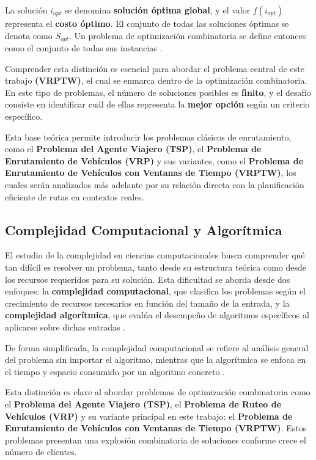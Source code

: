 \documentclass[12pt,titlepage,twoside,openright]{book}
\begin{document}
La solución \(i_{opt}\) se denomina \textbf{solución óptima global}, y el valor \(f(i_{opt})\) representa el \textbf{costo óptimo}. El conjunto de todas las soluciones óptimas se denota como \(S_{opt}\). Un problema de optimización combinatoria se define entonces como el conjunto de todas sus instancias \citep{cobos2010}.

Comprender esta distinción es esencial para abordar el problema central de este trabajo \textbf{(VRPTW)}, el cual se enmarca dentro de la optimización combinatoria. En este tipo de problemas, el número de soluciones posibles es \textbf{finito}, y el desafío consiste en identificar cuál de ellas representa la \textbf{mejor opción} según un criterio específico.

Esta base teórica permite introducir los problemas clásicos de enrutamiento, como el \textbf{Problema del Agente Viajero (TSP)}, el \textbf{Problema de Enrutamiento de Vehículos (VRP)} y sus variantes, como el \textbf{Problema de Enrutamiento de Vehículos con Ventanas de Tiempo (VRPTW)}, los cuales serán analizados más adelante por su relación directa con la planificación eficiente de rutas en contextos reales.

\subsection{Complejidad Computacional y Algorítmica}

El estudio de la complejidad en ciencias computacionales busca comprender qué tan difícil es resolver un problema, tanto desde su estructura teórica como desde los recursos requeridos para su solución. Esta dificultad se aborda desde dos enfoques: la \textbf{complejidad computacional}, que clasifica los problemas según el crecimiento de recursos necesarios en función del tamaño de la entrada, y la \textbf{complejidad algorítmica}, que evalúa el desempeño de algoritmos específicos al aplicarse sobre dichas entradas \citep{garey1979computers, papadimitriou1994}.

De forma simplificada, la complejidad computacional se refiere al análisis general del problema sin importar el algoritmo, mientras que la algorítmica se enfoca en el tiempo y espacio consumido por un algoritmo concreto \citep{maldonado2013problema}.

Esta distinción es clave al abordar problemas de optimización combinatoria como el \textbf{Problema del Agente Viajero (TSP)}, el \textbf{Problema de Ruteo de Vehículos (VRP)} y su variante principal en este trabajo: el \textbf{Problema de Enrutamiento de Vehículos con Ventanas de Tiempo (VRPTW)}. Estos problemas presentan una explosión combinatoria de soluciones conforme crece el número de clientes.
\end{document}
